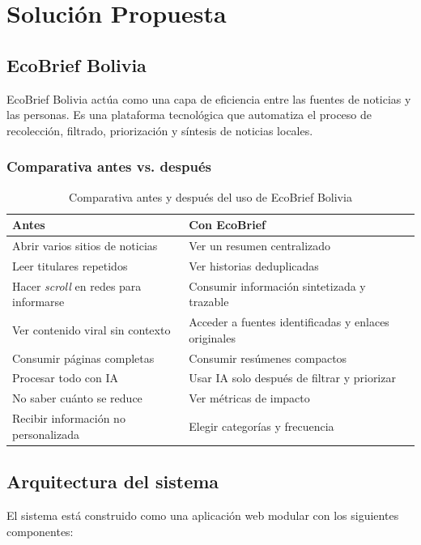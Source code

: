 \chapter{Soluci\'on Propuesta}

\section{EcoBrief Bolivia}

EcoBrief Bolivia act\'ua como una capa de eficiencia entre las fuentes de noticias y las personas. Es una plataforma tecnol\'ogica que automatiza el proceso de recolecci\'on, filtrado, priorizaci\'on y s\'intesis de noticias locales.

\subsection{Comparativa antes vs. despu\'es}

\begin{table}[H]
\centering
\begin{tabular}{p{6.5cm}p{6.5cm}}
\toprule
\textbf{Antes} & \textbf{Con EcoBrief} \\
\midrule
Abrir varios sitios de noticias & Ver un resumen centralizado \\
Leer titulares repetidos & Ver historias deduplicadas \\
Hacer \textit{scroll} en redes para informarse & Consumir informaci\'on sintetizada y trazable \\
Ver contenido viral sin contexto & Acceder a fuentes identificadas y enlaces originales \\
Consumir p\'aginas completas & Consumir res\'umenes compactos \\
Procesar todo con IA & Usar IA solo despu\'es de filtrar y priorizar \\
No saber cu\'anto se reduce & Ver m\'etricas de impacto \\
Recibir informaci\'on no personalizada & Elegir categor\'ias y frecuencia \\
\bottomrule
\end{tabular}
\caption{Comparativa antes y despu\'es del uso de EcoBrief Bolivia}
\end{table}

\section{Arquitectura del sistema}

El sistema est\'a construido como una aplicaci\'on web modular con los siguientes componentes:

